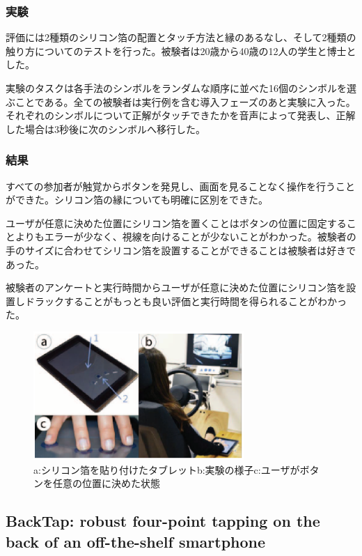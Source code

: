 \documentclass[11pt,a4paper]{jarticle}
\begin{document}
\subsubsection{実験}
評価には2種類のシリコン箔の配置とタッチ方法と縁のあるなし、そして2種類の触り方についてのテストを行った。被験者は20歳から40歳の12人の学生と博士とした。

実験のタスクは各手法のシンボルをランダムな順序に並べた16個のシンボルを選ぶことである。全ての被験者は実行例を含む導入フェーズのあと実験に入った。それぞれのシンボルについて正解がタッチできたかを音声によって発表し、正解した場合は3秒後に次のシンボルへ移行した。

\subsubsection{結果}
すべての参加者が触覚からボタンを発見し、画面を見ることなく操作を行うことができた。シリコン箔の縁についても明確に区別をできた。

ユーザが任意に決めた位置にシリコン箔を置くことはボタンの位置に固定することよりもエラーが少なく、視線を向けることが少ないことがわかった。被験者の手のサイズに合わせてシリコン箔を設置することができることは被験者は好きであった。

被験者のアンケートと実行時間からユーザが任意に決めた位置にシリコン箔を設置しドラックすることがもっとも良い評価と実行時間を得られることがわかった。

\begin{figure}[H]
  \begin{center}
  \includegraphics[width=8cm]{fig/figure1.eps}
  \caption{a:シリコン箔を貼り付けたタブレットb:実験の様子c:ユーザがボタンを任意の位置に決めた状態}
  \label{fig:1_test}
  \end{center}
\end{figure}


\subsection{BackTap: robust four-point tapping on the back of an off-the-shelf smartphone\cite{Zhang:2013}}
\end{document}

